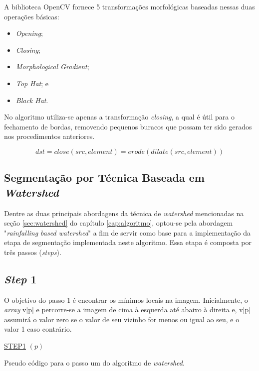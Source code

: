 A biblioteca OpenCV fornece 5 transformações morfológicas baseadas nessas duas operações básicas:
\begin{itemize}
    \item \textit{Opening};
    \item \textit{Closing};
    \item \textit{Morphological Gradient};
    \item \textit{Top Hat}; e 
    \item \textit{Black Hat}.
\end{itemize} 

No algoritmo utiliza-se apenas a transformação \textit{closing}, a qual é útil para o fechamento de bordas, removendo pequenos buracos que possam ter sido gerados nos procedimentos anteriores.

\[dst = close(src, element) = erode(dilate(src, element))\]


\subsection{Segmentação por Técnica Baseada em \textit{Watershed}}
Dentre as duas principais abordagens da técnica de \textit{watershed} mencionadas na seção \ref{sec:watershed} do capítulo \ref{cap:algoritmo}, optou-se pela abordagem "\textit{rainfalling based watershed}" a fim de servir como base para a implementação da etapa de segmentação implementada neste algoritmo. Essa etapa é composta por três passos (\textit{steps}). 

\subsection{\textit{Step } 1}
O objetivo do passo 1 é encontrar os mínimos locais na imagem. Inicialmente, o \textit{array} v[p] e percorre-se a imagem de cima à esquerda até abaixo à direita e, v[p] assumirá o valor zero se o valor de seu vizinho for menos ou igual ao seu, e o valor 1 caso contrário.


\begin{algorithm}[H]
\SetAlgoLined


    \underline{STEP1} $(p)$\;
 
\caption{Pseudo código para o passo um do algoritmo de \textit{watershed}. \cite{ruparelia2012implementation}}
\end{algorithm}




